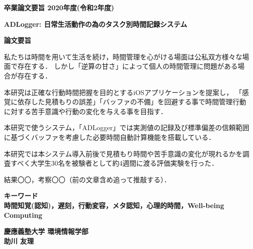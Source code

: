 \begin{center}
\textbf{\Large 卒業論文要旨 2020年度(令和2年度)}

\vspace{6.18mm}

\textbf{\Large ADLogger: 日常生活動作の為のタスク別時間記録システム}
\end{center}

\vspace{10mm}

\begin{flushleft}
\textbf{論文要旨}\\
\end{flushleft}
私たちは時間を用いて生活を続け，時間管理を心がける場面は公私双方様々な場面で存在する．
しかし「逆算の甘さ」によって個人の時間管理に問題がある場合が存在する．

本研究は正確な行動時間把握を目的とするiOSアプリケーションを提案し，
「感覚に依存した見積もりの誤差」「バッファの不備」を回避する事で時間管理行動に対する苦手意識や行動の変化を与える事を目指す．

本研究で使うシステム，「ADLogger」では実測値の記録及び標準偏差の信頼範囲に基づくバッファを考慮した必要時間自動計算機能を搭載している．

本研究では本システム導入前後で見積もり時間や苦手意識の変化が現れるかを調査すべく大学生30名を被験者として約4週間に渡る評価実験を行った．

結果〇〇，考察〇〇（前の文章含め追って推敲する）．

\begin{flushleft}
\textbf{キーワード}\\
\textbf{時間知覚(認知)，遅刻，行動変容，メタ認知，心理的時間，Well-being Computing}

\end{flushleft}

\begin{flushright}
\textbf{慶應義塾大学 環境情報学部}\\
\textbf{助川 友理}
\end{flushright}
\newpage


